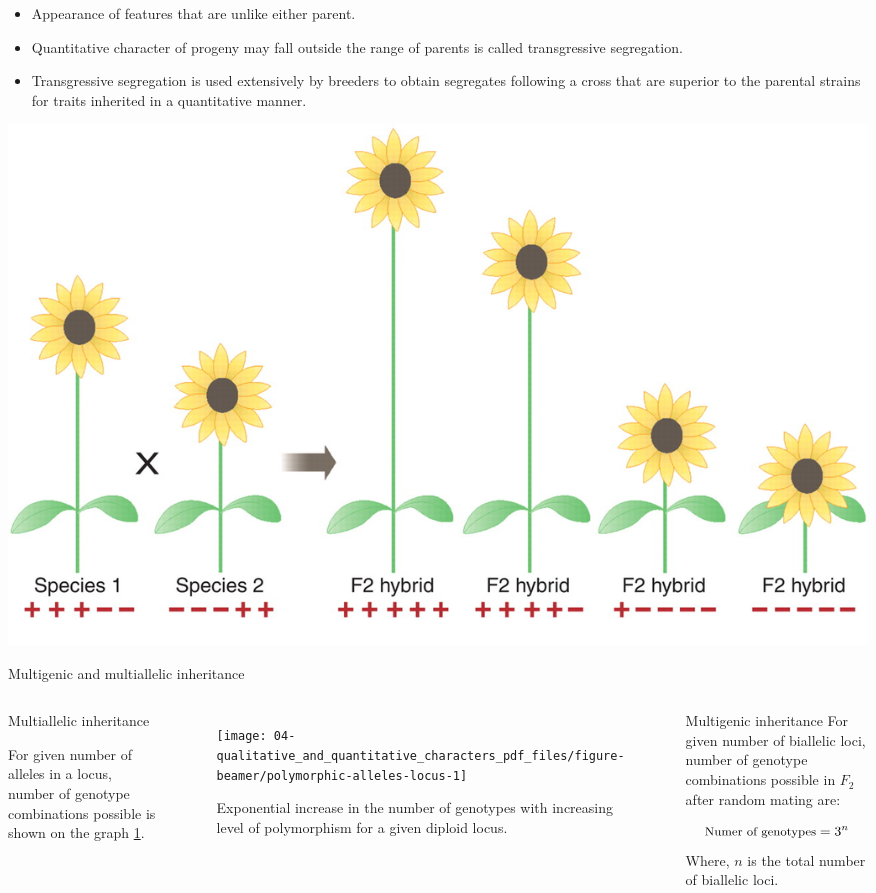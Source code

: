 \documentclass[11pt,ignorenonframetext,aspectratio=169]{beamer}
\providecommand{\tightlist}{%
  \setlength{\itemsep}{0pt}\setlength{\parskip}{0pt}}
\begin{document}
\begin{frame}{}
\protect\hypertarget{section-5}{}
\begin{itemize}
\tightlist
\item
  Appearance of features that are unlike either parent.
\item
  Quantitative character of progeny may fall outside the range of
  parents is called transgressive segregation.
\item
  Transgressive segregation is used extensively by breeders to obtain
  segregates following a cross that are superior to the parental strains
  for traits inherited in a quantitative manner.
\end{itemize}

\begin{center}\includegraphics[width=0.5\linewidth]{./images/transgressive_segregation} \end{center}
\end{frame}

\begin{frame}{Multigenic and multiallelic inheritance}
\protect\hypertarget{multigenic-and-multiallelic-inheritance}{}
\begin{columns}[T, onlytextwidth]


\begin{block}{Multiallelic inheritance}

For given number of alleles in a locus, number of genotype combinations possible is shown on the graph \ref{fig:polymorphic-alleles-locus}.
\end{block}

\begin{figure}

{\centering \texttt{[image: 04-qualitative\_and\_quantitative\_characters\_pdf\_files/figure-beamer/polymorphic-alleles-locus-1]} 

}

\caption{Exponential increase in the number of genotypes with increasing level of polymorphism for a given diploid locus.}\label{fig:polymorphic-alleles-locus}
\end{figure}

\hspace{-0.4cm}
\begin{block}{Multigenic inheritance}
\small
For given number of biallelic loci, number of genotype combinations possible in $F_2$ after random mating are:

$$
\small
\text{Numer of genotypes} = 3^n
$$
Where, $n$ is the total number of biallelic loci. 
\end{block}
\end{columns}
\end{frame}
\end{document}

